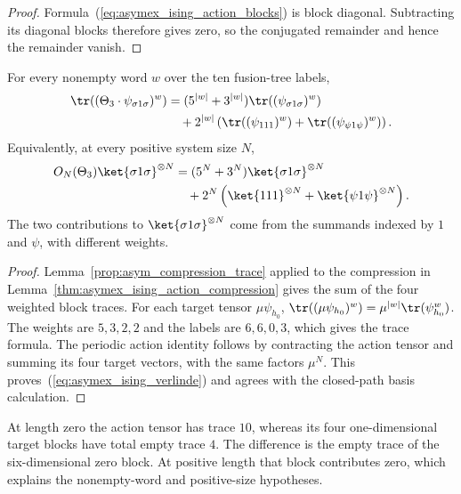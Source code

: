 \begin{proof}
    \leanok
    Formula~(\ref{eq:asymex_ising_action_blocks}) is block diagonal.
    Subtracting its diagonal blocks therefore gives zero, so the
    conjugated remainder and hence the remainder vanish.
\end{proof}

\begin{lemma}%
    \label{thm:asymex_ising_action_trace}
    \leanok
    For every nonempty word $w$ over the ten fusion-tree labels,
    \begin{align}
        \tr((\Theta_3\cdot\psi_{\sigma1\sigma})^w)
         & =(5^{|w|}+3^{|w|})\tr((\psi_{\sigma1\sigma})^w) \notag \\
         & \quad+2^{|w|}\left(\tr((\psi_{111})^w)
        +\tr((\psi_{\psi1\psi})^w)\right).
    \end{align}
    Equivalently, at every positive system size $N$,
    \begin{align}
        O_N(\Theta_3)\ket{\sigma1\sigma}^{\otimes N}
         & =(5^N+3^N)\ket{\sigma1\sigma}^{\otimes N} \notag \\
         & \quad+2^N\left(\ket{111}^{\otimes N}
        +\ket{\psi1\psi}^{\otimes N}\right).
        \label{eq:asymex_ising_verlinde}
    \end{align}
    The two contributions to $\ket{\sigma1\sigma}^{\otimes N}$ come
    from the summands indexed by $1$ and $\psi$, with different weights.
\end{lemma}

\begin{proof}
    \leanok
    Lemma~\ref{prop:asym_compression_trace} applied to the
    compression in Lemma~\ref{thm:asymex_ising_action_compression}
    gives the sum of the four weighted block traces.
    For each target tensor $\mu\psi_{h_0}$,
    $\tr((\mu\psi_{h_0})^w)=\mu^{|w|}\tr(\psi_{h_0}^w)$.
    The weights are $5,3,2,2$ and the labels are $6,6,0,3$,
    which gives the trace formula. The periodic action identity follows
    by contracting the action tensor and summing its four target
    vectors, with the same factors $\mu^N$.
    This proves~(\ref{eq:asymex_ising_verlinde}) and agrees with the
    closed-path basis calculation.
\end{proof}

At length zero the action tensor has trace $10$, whereas its four
one-dimensional target blocks have total empty trace $4$. The difference
is the empty trace of the six-dimensional zero block. At positive length
that block contributes zero, which explains the nonempty-word
and positive-size hypotheses.


